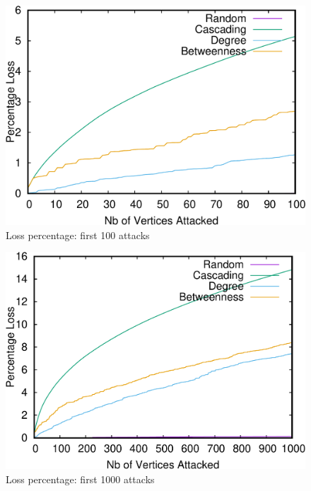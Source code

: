 \begin{figure}
\centering
\includegraphics[scale=0.35]{bench/generated/loss-100-crop.pdf}
\caption{Loss percentage: first 100 attacks}
\label{fig:loss-100}
\end{figure}

\begin{figure}
\centering
\includegraphics[scale=0.35]{bench/generated/loss-1000-crop.pdf}
\caption{Loss percentage: first 1000 attacks}
\label{fig:loss-1000}
\end{figure}

